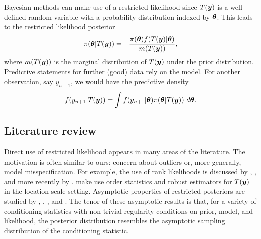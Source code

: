 \documentclass[12pt]{article}
\def\bth{\mbox{\boldmath $\theta$}}
\newcommand{\by}{\mbox{\boldmath $y$}}
\begin{document}
Bayesian methods can make use of a restricted likelihood %
since $T(\by)$ is a well-defined random variable with a probability distribution indexed by $\bth$.  
This leads to the restricted likelihood posterior 
\begin{eqnarray}
\label{RestrictedPosterior}
\pi(\bth | T(\by)) & = & \frac{\pi(\bth) f(T(\by) | \bth)}{m(T(\by))} ,
\end{eqnarray}
where $m(T(\by))$ is the marginal distribution of $T(\by)$ under the prior distribution.  
Predictive statements for further (good) data rely on the model.  For another observation,
say $y_{n+1}$, we would have the predictive density 
\begin{eqnarray}
\label{RestrictedpredDist}
f(y_{n+1} | T(\by)) = \int f(y_{n+1} | \bth) \pi(\bth | T(\by))\ d\bth .  
\end{eqnarray}

\subsection{Literature review}
Direct use of restricted likelihood appears in many areas of the literature.  The motivation is often similar to ours:   
concern about outliers or, more generally, model misspecification.  For example, the use of rank likelihoods is discussed by \cite{savage1969}, \cite{pettitt1983, pettitt1982}, and more recently by \cite{hoff2013}.  
\cite{lewis2012} make use order statistics and robust estimators for $T(\by)$ in the location-scale setting. 
Asymptotic properties of restricted posteriors are studied by \cite{doksum1990}, \cite{clarke1995}, \cite{yuan2004},  and \cite{hwang2005}. The tenor of these asymptotic 
results is that, for a variety of conditioning statistics with non-trivial regularity conditions on prior, model, and likelihood, the
posterior distribution resembles the asymptotic sampling distribution of the conditioning statistic.  
\end{document}
